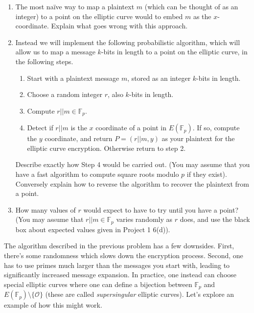 \documentclass[11pt]{article}
\newcommand{\bF}{\mathbb{F}}
\newcommand{\cO}{\mathcal{O}}
\begin{document}
\begin{enumerate}
{  \begin{enumerate}
    \item{
    The most na\"ive way to map a plaintext $m$ (which can be thought of as an integer) to a point on the elliptic curve would to embed $m$ as the $x$-coordinate.  Explain what goes wrong with this approach.
    }
    \item{
    Instead we will implement the following probabilistic algorithm, which will allow us to map a message $k$-bits in length to a point on the elliptic curve, in the following steps.
    \begin{enumerate}[(1)]
      \item{
      Start with a plaintext message $m$, stored as an integer $k$-bits in length.
      }
      \item{
      Choose a random integer $r$, also $k$-bits in length.
      }
      \item{
      Compute $r||m\in\bF_p$.
      }
      \item{
      Detect if $r||m$ is the $x$ coordinate of a point in $E(\bF_p)$.  If so, compute the $y$ coordinate, and return $P = (r||m,y)$ as your plaintext for the elliptic curve encryption.  Otherwise return to step 2.
      }
    \end{enumerate}
    Describe exactly how Step 4 would be carried out.  (You may assume that you have a fast algorithm to compute square roots modulo $p$ if they exist).  Conversely explain how to reverse the algorithm to recover the plaintext from a point.
    }
    \item{
    How many values of $r$ would expect to have to try until you have a point?  (You may assume that $r||m\in\bF_p$ varies randomly as $r$ does, and use the black box about expected values given in Project 1 6(d)).
    }
    \end{enumerate}
  }
 \end{enumerate}
The algorithm described in the previous problem has a few downsides.  First, there's some randomness which slows down the encryption process.  Second, one has to use primes much larger than the messages you start with, leading to significantly increased message expansion.  In practice, one instead can choose special elliptic curves where one can define a bijection between $\bF_p$ and $E(\bF_p)\setminus\{\cO\}$ (these are called \textit{supersingular} elliptic curves).  Let's explore an example of how this might work.
\end{document}
